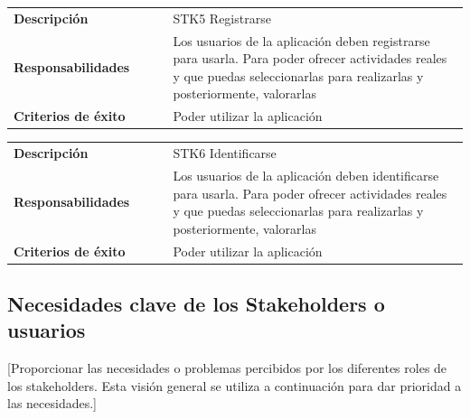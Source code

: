 \documentclass[11pt]{article}
\begin{document}
\begin{table}[H]
  \centering
  \begin{tabular}{p{0.35\linewidth}|p{0.65\linewidth}}
    \toprule
    \textbf{Descripción} & STK5 Registrarse\\
    \textbf{Responsabilidades} & Los usuarios de la aplicación deben registrarse para usarla. Para poder ofrecer actividades reales y que puedas seleccionarlas para realizarlas y posteriormente, valorarlas\\
    \textbf{Criterios de éxito} &  Poder utilizar la aplicación\\
    \bottomrule
  \end{tabular}
\end{table}

\begin{table}[H]
  \centering
  \begin{tabular}{p{0.35\linewidth}|p{0.65\linewidth}}
    \toprule
    \textbf{Descripción} & STK6 Identificarse\\
    \textbf{Responsabilidades} & Los usuarios de la aplicación deben identificarse para usarla. Para poder ofrecer actividades reales y que puedas seleccionarlas para realizarlas y posteriormente, valorarlas\\
    \textbf{Criterios de éxito} & Poder utilizar la aplicación \\
    \bottomrule
  \end{tabular}
\end{table}


\subsection{Necesidades clave de los Stakeholders o usuarios}
[Proporcionar las necesidades o problemas percibidos por los diferentes roles de los stakeholders. Esta visión general se utiliza a continuación para dar prioridad a las necesidades.]
          
\end{document}
